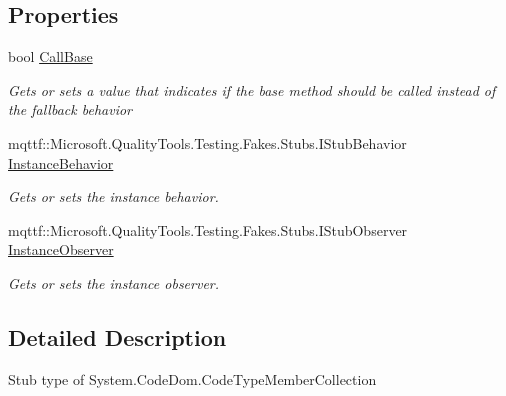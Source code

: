 \subsection*{Properties}
\begin{DoxyCompactItemize}
\item 
bool \hyperlink{class_system_1_1_code_dom_1_1_fakes_1_1_stub_code_type_member_collection_abd1b1d20c14f740bfdb8defff1f82098}{Call\-Base}
\begin{DoxyCompactList}\small\item\em Gets or sets a value that indicates if the base method should be called instead of the fallback behavior\end{DoxyCompactList}\item 
mqttf\-::\-Microsoft.\-Quality\-Tools.\-Testing.\-Fakes.\-Stubs.\-I\-Stub\-Behavior \hyperlink{class_system_1_1_code_dom_1_1_fakes_1_1_stub_code_type_member_collection_a615cea43a403100f235ce8d1cf083ba4}{Instance\-Behavior}
\begin{DoxyCompactList}\small\item\em Gets or sets the instance behavior.\end{DoxyCompactList}\item 
mqttf\-::\-Microsoft.\-Quality\-Tools.\-Testing.\-Fakes.\-Stubs.\-I\-Stub\-Observer \hyperlink{class_system_1_1_code_dom_1_1_fakes_1_1_stub_code_type_member_collection_a03b2f91168607fb9de8eb98cb73774be}{Instance\-Observer}
\begin{DoxyCompactList}\small\item\em Gets or sets the instance observer.\end{DoxyCompactList}\end{DoxyCompactItemize}


\subsection{Detailed Description}
Stub type of System.\-Code\-Dom.\-Code\-Type\-Member\-Collection



